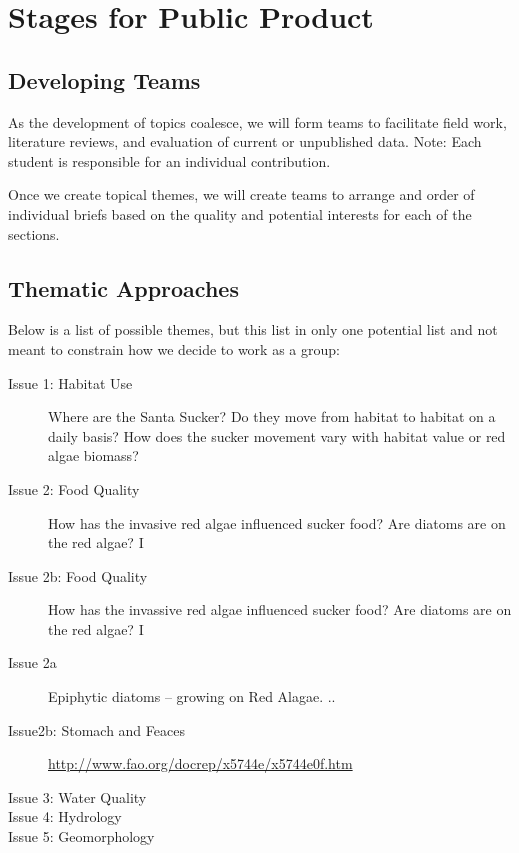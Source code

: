 \documentclass{tufte-handout}\usepackage[]{graphicx}\usepackage[]{color}
\begin{document}
\section{Stages for Public Product}

\subsection{Developing Teams}

As the development of topics coalesce, we will form teams to facilitate field work, literature reviews, and evaluation of current or unpublished data. Note: Each student is responsible for an individual contribution. 

Once we create topical themes, we will create teams to arrange and order of  individual briefs based on the quality and potential interests for each of the sections.  

\subsection{Thematic Approaches}

Below is a list of possible themes, but this list in only one potential list and not meant to constrain how we decide to work as a group: 

\begin{description}
  \item[Issue 1: Habitat Use] Where are the Santa Sucker?  Do they move from habitat to habitat on a daily basis? How does the sucker movement vary with habitat value or red algae biomass?
  

  
  \item[Issue 2: Food Quality] How has the invasive red algae influenced sucker food? Are diatoms are on the red algae? I

  \item[Issue 2b: Food Quality] How has the invassive red algae influenced sucker food? Are diatoms are on the red algae? I

  \item[Issue 2a] Epiphytic diatoms -- growing on Red Alagae. ..
  


  \item[Issue2b: Stomach and Feaces] 
  
\href{http://www.fao.org/docrep/x5744e/x5744e0f.htm}{http://www.fao.org/docrep/x5744e/x5744e0f.htm}
  
  \item[Issue 3: Water Quality] 
  \item[Issue 4: Hydrology]
  \item[Issue 5: Geomorphology] 
\end{description}
\end{document}
